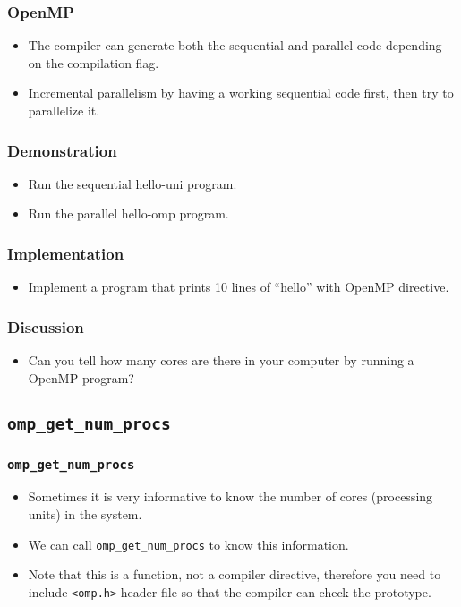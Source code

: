 \documentclass{beamer}
\begin{document}
\begin{frame}
\frametitle{OpenMP} 
\begin{itemize}
\item The compiler can generate both the sequential and parallel
  code depending on the compilation flag.
\item Incremental parallelism by having a working sequential code
  first, then try to parallelize it.
\end{itemize}
\end{frame}

\begin{frame}
\frametitle{Demonstration}
\begin{itemize}
\item Run the sequential hello-uni program.
\item Run the parallel hello-omp program.
\end{itemize}
\end{frame}

\begin{frame}
\frametitle{Implementation}
\begin{itemize}
\item Implement a program that prints 10 lines of ``hello'' with
  OpenMP directive.
\end{itemize}
\end{frame}

\begin{frame}
\frametitle{Discussion}
\begin{itemize}
\item Can you tell how many cores are there in your computer by running
  a OpenMP program?
\end{itemize}
\end{frame}

\subsection{\tt omp\_get\_num\_procs}

\begin{frame}
\frametitle{\tt omp\_get\_num\_procs}
\begin{itemize}
\item Sometimes it is very informative to know the number of cores
  (processing units) in the system.
\item We can call {\tt omp\_get\_num\_procs} to know this information.
\item Note that this is a function, not a compiler directive,
  therefore you need to include {\tt <omp.h>} header file so that the
  compiler can check the prototype.
\end{itemize}
\end{frame}
\end{document}
